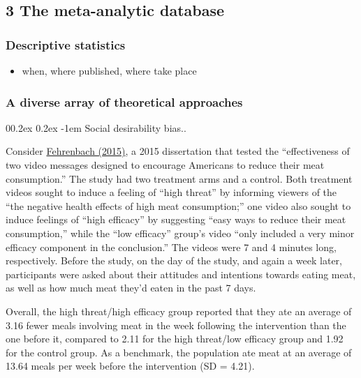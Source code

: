 \documentclass[
  man]{apa6}
\makeatletter
\providecommand{\tightlist}{%
  \setlength{\itemsep}{0pt}\setlength{\parskip}{0pt}}
\let\oldparagraph\paragraph
\renewcommand{\paragraph}[1]{\oldparagraph{#1}\mbox{}}
\renewcommand{\paragraph}{\@startsection{paragraph}{4}{\parindent}%
  {0\baselineskip \@plus 0.2ex \@minus 0.2ex}%
  {-1em}%
  {\normalfont\normalsize\bfseries\itshape\typesectitle}}
\makeatother
\begin{document}
\subsection{3 The meta-analytic database}\label{the-meta-analytic-database}

\subsubsection{Descriptive statistics}\label{descriptive-statistics}

\begin{itemize}
\tightlist
\item
  when, where published, where take place
\end{itemize}

\subsubsection{A diverse array of theoretical approaches}\label{a-diverse-array-of-theoretical-approaches}

\paragraph{Social desirability bias..}\label{social-desirability-bias..}

Consider \href{https://www.proquest.com/docview/1712399091?fromopenview=true&pq-origsite=gscholar}{Fehrenbach (2015)}, a 2015 dissertation that tested the ``effectiveness of two video messages designed to encourage Americans to reduce their meat consumption.'' The study had two treatment arms and a control. Both treatment videos sought to induce a feeling of ``high threat'' by informing viewers of the ``the negative health effects of high meat consumption;'' one video also sought to induce feelings of ``high efficacy'' by suggesting ``easy ways to reduce their meat consumption,'' while the ``low efficacy'' group's video ``only included a very minor efficacy component in the conclusion.'' The videos were 7 and 4 minutes long, respectively. Before the study, on the day of the study, and again a week later, participants were asked about their attitudes and intentions towards eating meat, as well as how much meat they'd eaten in the past 7 days.

Overall, the high threat/high efficacy group reported that they ate an average of 3.16 fewer meals involving meat in the week following the intervention than the one before it, compared to 2.11 for the high threat/low efficacy group and 1.92 for the control group. As a benchmark, the population ate meat at an average of 13.64 meals per week before the intervention (SD = 4.21).
\end{document}
